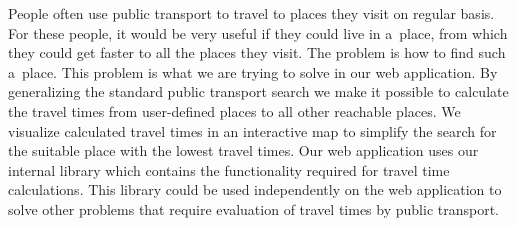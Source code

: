 \documentclass[12pt]{report}
\begin{document}
People often use public transport to travel to places they visit on regular basis. For these people, it would be very useful if they could live in a~place, from which they could get faster to all the places they visit. The problem is how to find such a~place.
This problem is what we are trying to solve in our web application. By generalizing the standard public transport search we make it possible to calculate the travel times from user-defined places to all other reachable places. We visualize calculated travel times in an interactive map to simplify the search for the suitable place with the lowest travel times.
Our web application uses our internal library which contains the functionality required for travel time calculations. This library could be used independently on the web application to solve other problems that require evaluation of travel times by public transport.
\end{document}
